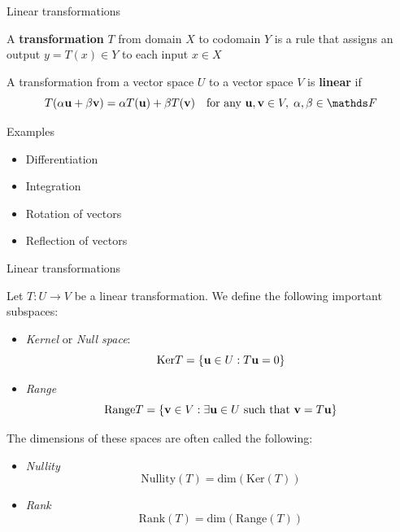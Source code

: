 \documentclass [aspectratio=169]{beamer}
\begin{document}
\begin{frame}{Linear transformations}
\begin{definition}
A \textbf{transformation} $T$ from domain $X$ to codomain $Y$ is a rule that assigns an output $y = T(x) \in Y$ to each input $x \in X$
\end{definition}

\begin{definition}
A transformation from a vector space $U$ to a vector space $V$ is \textbf{linear} if
\begin{equation*}
    T(\alpha \bu + \beta \bv) = \alpha T(\bu) + \beta T(\bv) \quad \text{for any } \bu, \bv \in V, \; \alpha, \beta \in \F
\end{equation*}
\end{definition}

\end{frame}


\begin{frame}{Examples}

\begin{itemize}
\item Differentiation
\item Integration
\item Rotation of vectors
\item Reflection of vectors
\end{itemize}


\end{frame}


\begin{frame}{Linear transformations}
\begin{definition}
Let $T:U \to V$ be a linear transformation. We define the following important subspaces:
\begin{itemize}
\item \emph{Kernel} or \emph{Null space}: 
$$\text{Ker} T = \{{\mathbf{u}} \in U : T{\mathbf{u}} = 0 \}$$
\item \emph{Range} 
$$\text{Range} T = \{{\mathbf{v}} \in V : \exists {\mathbf{u}} \in U \text{ such that } {\mathbf{v}} = T {\mathbf{u}} \}$$
\end{itemize}
The dimensions of these spaces are often called the following:
\begin{itemize}
\item \emph{Nullity}
$$\text{Nullity}(T) = \text{dim}(\text{Ker}(T))$$
\item \emph{Rank}
$$\text{Rank}(T) = \text{dim}(\text{Range}(T))$$
\end{itemize}
\end{definition}

\end{frame}
\end{document}
